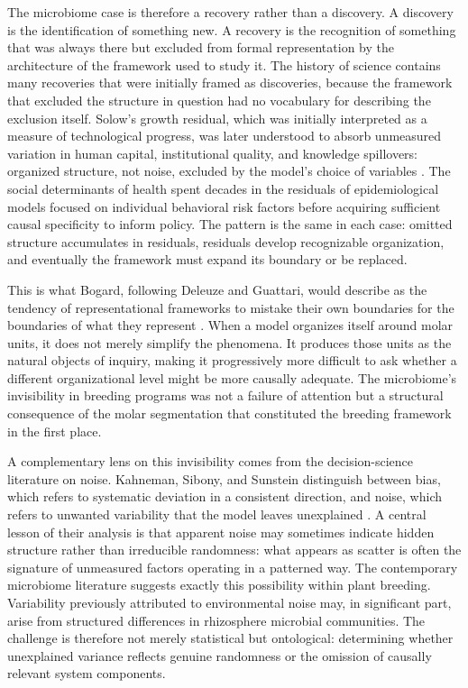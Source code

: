 \documentclass[11pt, a4paper]{article}
\begin{document}
The microbiome case is therefore a recovery rather than a discovery. A discovery is the identification of something new. A recovery is the recognition of something that was always there but excluded from formal representation by the architecture of the framework used to study it. The history of science contains many recoveries that were initially framed as discoveries, because the framework that excluded the structure in question had no vocabulary for describing the exclusion itself. Solow's growth residual, which was initially interpreted as a measure of technological progress, was later understood to absorb unmeasured variation in human capital, institutional quality, and knowledge spillovers: organized structure, not noise, excluded by the model's choice of variables \citep{Solow1957}. The social determinants of health spent decades in the residuals of epidemiological models focused on individual behavioral risk factors before acquiring sufficient causal specificity to inform policy. The pattern is the same in each case: omitted structure accumulates in residuals, residuals develop recognizable organization, and eventually the framework must expand its boundary or be replaced.

This is what Bogard, following Deleuze and Guattari, would describe as the tendency of representational frameworks to mistake their own boundaries for the boundaries of what they represent \citep{bogard1998}. When a model organizes itself around molar units, it does not merely simplify the phenomena. It produces those units as the natural objects of inquiry, making it progressively more difficult to ask whether a different organizational level might be more causally adequate. The microbiome's invisibility in breeding programs was not a failure of attention but a structural consequence of the molar segmentation that constituted the breeding framework in the first place.

A complementary lens on this invisibility comes from the decision-science literature on noise. Kahneman, Sibony, and Sunstein distinguish between bias, which refers to systematic deviation in a consistent direction, and noise, which refers to unwanted variability that the model leaves unexplained \citep{kahneman2021}. A central lesson of their analysis is that apparent noise may sometimes indicate hidden structure rather than irreducible randomness: what appears as scatter is often the signature of unmeasured factors operating in a patterned way. The contemporary microbiome literature suggests exactly this possibility within plant breeding. Variability previously attributed to environmental noise may, in significant part, arise from structured differences in rhizosphere microbial communities. The challenge is therefore not merely statistical but ontological: determining whether unexplained variance reflects genuine randomness or the omission of causally relevant system components.
\end{document}
